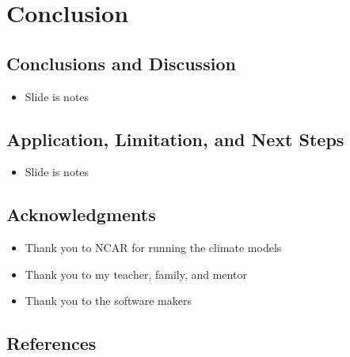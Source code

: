 \documentclass[little]{basic}
\begin{document}
\section{Conclusion}
\label{sec:org92a7dae}
\subsection*{Conclusions and Discussion}
\label{sec:orge52295e}
\begin{itemize}
\item Slide is notes
\end{itemize}
\subsection*{Application, Limitation, and Next Steps}
\label{sec:org0c817e6}
\begin{itemize}
\item Slide is notes
\end{itemize}
\subsection*{Acknowledgments}
\label{sec:orgeaf66eb}
\begin{itemize}
\item Thank you to NCAR for running the climate models
\item Thank you to my teacher, family, and mentor
\item Thank you to the software makers
\end{itemize}
\subsection*{References}
\label{sec:org0630c81}
\end{document}
